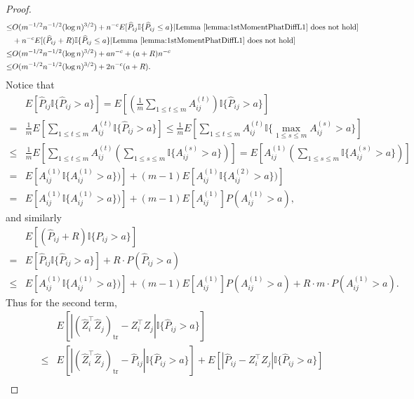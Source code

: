 \begin{proof}
\begin{align*}
	\le & O(m^{-1/2} n^{-1/2} (\log n)^{3/2}) + n^{-c} E[\hat{P}_{ij} \mathbb{I}\{\hat{P}_{ij} \le a\}| \mathrm{Lemma\ } \ref{lemma:1stMomentPhatDiffL1} \mathrm{\ does\ not\ hold}] \\
	& + n^{-c} E[(\hat{P}_{ij} + R) \mathbb{I}\{\hat{P}_{ij} \le a\}| \mathrm{Lemma\ } \ref{lemma:1stMomentPhatDiffL1} \mathrm{\ does\ not\ hold}] \\
	\le & O(m^{-1/2} n^{-1/2} (\log n)^{3/2}) + a n^{-c} + (a+R) n^{-c} \\
	\le & O(m^{-1/2} n^{-1/2} (\log n)^{3/2}) + 2 n^{-c} (a + R).
\end{align*}
Notice that
\begin{align*}
	& E[\hat{P}_{ij} \mathbb{I} \{ \hat{P}_{ij} > a \}]
	= E[\left(\frac{1}{m} \sum_{1 \le t \le m} A_{ij}^{(t)}\right) \mathbb{I} \{ \hat{P}_{ij} > a \}] \\
	= & \frac{1}{m} E[\sum_{1 \le t \le m} A_{ij}^{(t)} \mathbb{I} \{ \hat{P}_{ij} > a \}]
	\le \frac{1}{m} E[\sum_{1 \le t \le m} A_{ij}^{(t)} \mathbb{I} \{ \max_{1 \le s \le m} A_{ij}^{(s)} > a \}] \\
	\le & \frac{1}{m} E[\sum_{1 \le t \le m} A_{ij}^{(t)} \left(\sum_{1 \le s \le m}\mathbb{I} \{ A_{ij}^{(s)} > a \}\right)]
	= E[A_{ij}^{(1)} \left(\sum_{1 \le s \le m}\mathbb{I} \{ A_{ij}^{(s)} > a \}\right)] \\
	= & E[A_{ij}^{(1)} \mathbb{I} \{ A_{ij}^{(1)} > a \})] + (m-1) E[A_{ij}^{(1)} \mathbb{I} \{ A_{ij}^{(2)} > a \})] \\
	= & E[A_{ij}^{(1)} \mathbb{I} \{ A_{ij}^{(1)} > a \})] + (m-1) E[A_{ij}^{(1)}] P(A_{ij}^{(1)} > a),
\end{align*}
and similarly
\begin{align*}
	& E[(\hat{P}_{ij} + R) \mathbb{I} \{ \hat{P}_{ij} > a \}] \\
	= & E[\hat{P}_{ij} \mathbb{I} \{ \hat{P}_{ij} > a \}] + R \cdot P(\hat{P}_{ij} > a) \\
	\le & E[A_{ij}^{(1)} \mathbb{I} \{ A_{ij}^{(1)} > a \})] + (m-1) E[A_{ij}^{(1)}] P(A_{ij}^{(1)} > a)
	+ R \cdot m \cdot P(A_{ij}^{(1)} > a).
\end{align*}
Thus for the second term,
\begin{align*}
	& E[|(\hat{Z}_i^{\top} \hat{Z}_j)_{\mathrm{tr}} - Z_i^{\top} Z_j| \mathbb{I}\{\hat{P}_{ij} > a\}] \\
	\le & E[|(\hat{Z}_i^{\top} \hat{Z}_j)_{\mathrm{tr}} - \hat{P}_{ij}| \mathbb{I}\{\hat{P}_{ij} > a\}] + E[|\hat{P}_{ij} - Z_i^{\top} Z_j| \mathbb{I}\{\hat{P}_{ij} > a\}] \\

\end{align*}
\end{proof}

